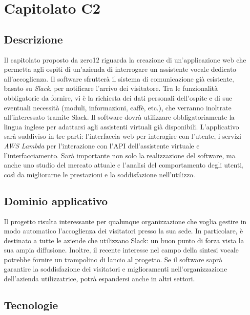 \newpage
\section{Capitolato C2}

\subsection{Descrizione}

Il capitolato proposto da zero12 riguarda la creazione di un'applicazione
web che permetta agli ospiti di un'azienda di interrogare un assistente
vocale dedicato all'accoglienza. Il software sfrutterà il sistema
di comunicazione già esistente, basato su \textit{Slack}, per notificare l'arrivo dei visitatore. Tra le funzionalità obbligatorie da fornire,
vi è la richiesta dei dati personali dell'ospite e di sue eventuali
necessità (moduli, informazioni, caffè, etc.), che verranno inoltrate
all'interessato tramite Slack. Il software dovrà utilizzare obbligatoriamente
la lingua inglese per adattarsi agli assistenti virtuali già disponibili.
L'applicativo sarà suddiviso in tre parti: l'interfaccia web per interagire
con l'utente, i servizi \textit{AWS Lambda} per l'interazione con l'API dell'assistente
virtuale e l'interfacciamento. Sarà importante non solo la realizzazione
del software, ma anche uno studio del mercato attuale e l'analisi
del comportamento degli utenti, così da migliorarne le prestazioni
e la soddisfazione nell'utilizzo.

\subsection{Dominio applicativo}

Il progetto risulta interessante per qualunque organizzazione che voglia
gestire in modo automatico l'accoglienza dei visitatori presso la sua sede. In particolare,
è destinato a tutte le aziende che utilizzano Slack: un buon punto di forza vista
la sua ampia diffusione. Inoltre, il recente interesse nel campo della
sintesi vocale potrebbe fornire un trampolino di lancio al progetto.
Se il software saprà garantire la soddisfazione dei visitatori e miglioramenti
nell'organizzazione dell'azienda utilizzatrice, potrà espandersi
anche in altri settori.

\subsection{Tecnologie}

